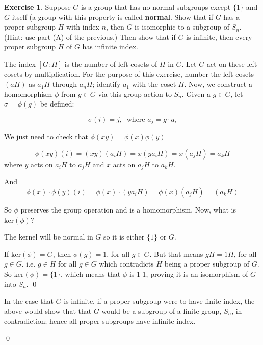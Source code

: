 \documentclass[11pt,oneside]{article}
\numberwithin{equation}{section}
\theoremstyle{definition}
\newtheorem{exercise}{Exercise}
\def\ker{\mathrm{ker}}
\begin{document}
\begin{exercise}
  Suppose $G$ is a group that has no normal subgroups except $\{ 1 \}$ and $G$ itself (a group with this
  property is called \textbf{normal}. Show that if $G$ has a proper subgroup $H$ with index $n$,
  then $G$ is isomorphic to a subgroup of $S_n$. (Hint: use part (A) of the previous.)  Then show that if $G$
  is infinite, then every proper subgroup $H$ of $G$ has infinite index. 
\end{exercise}
\begin{solution}
  The index $[G:H]$ is the number of left-cosets of $H$ in $G$.  Let
  $G$ act on these left cosets by multiplication.  For the purpose of
  this exercise, number the left cosets $(aH)$ as $a_1H$ through $a_nH$;
  identify $a_1$ with the coset $H$.  Now, we construct a homomorphism
  $\phi$ from $g \in G$ via this group action to $S_n$. Given a $g \in G$,
  let $\sigma = \phi(g)$ be defined:

  \[
  \sigma(i) = j, \ \textrm{ where }  a_j = g \cdot a_i
  \]

  We just need to check that $\phi(x y) = \phi(x) \phi(y)$

  \[
  \phi(x y)(i) = (x y) (a_iH) = x ( y a_i H) = x (a_j H) = a_k H 
  \]
  where $y$ acts on $a_iH$ to $a_jH$ and $x$ acts on $a_jH $ to $a_k H$.

  And
  \[
  \phi(x) \cdot \phi(y)(i) = \phi(x) \cdot (y a_i H) = \phi(x) (a_j H) = (a_k H)
  \]

  So $\phi$ preserves the group operation and is a homomorphism.  Now, what is $\ker(\phi)$?

  The kernel will be normal in $G$ so it is either $\{ 1 \}$ or $G$.

  If $\ker(\phi) = G$, then $\phi(g) = 1$, for all $g \in G$.  But that means
  $gH = 1H$, for all $g \in G$.  i.e. $g \in H$ for all $g \in G$ which contradicts
  $H$ being a proper subgroup of $G$.  So $\ker(\phi) = \{ 1 \}$, which means that
  $\phi$ is 1-1, proving it is an isomorphism of $G$ into $S_n$.  \qed


  In the case that $G$ is infinite, if a proper subgroup were to have finite index, the above would
  show that that $G$ would be a subgroup of a finite group, $S_n$, in contradiction; hence all
  proper subgroups have infinite index.

  \qed
\end{solution}
\end{document}
